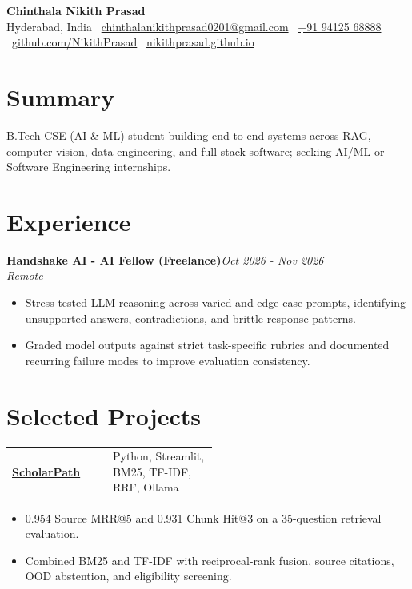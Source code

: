 \documentclass[10pt,letterpaper]{article}
\makeatletter
\newcommand{\projectheading}[3]{%
  \begin{tabularx}{\linewidth}{@{}>{\raggedright\arraybackslash}X>{\raggedleft\arraybackslash}p{0.51\linewidth}@{}}
    \href{#2}{\textbf{#1}} & {\footnotesize #3}\\
  \end{tabularx}%
}
\makeatother
\begin{document}
\fontsize{10.2}{12.8}\selectfont

\begin{center}
  {\fontsize{20}{22}\selectfont\bfseries Chinthala Nikith Prasad}\\[3pt]
  {\small Hyderabad, India \textbar\
  \href{mailto:chinthalanikithprasad0201@gmail.com}{chinthalanikithprasad0201@gmail.com} \textbar\
  \href{tel:+919412568888}{+91 94125 68888} \textbar\
  \href{https://github.com/NikithPrasad}{github.com/NikithPrasad} \textbar\
  \href{https://nikithprasad.github.io}{nikithprasad.github.io}}
\end{center}
\vspace{-7pt}

\section*{Summary}
B.Tech CSE (AI \& ML) student building end-to-end systems across RAG, computer vision, data engineering, and full-stack software; seeking AI/ML or Software Engineering internships.

\section*{Experience}
\textbf{Handshake AI - AI Fellow (Freelance)}\hfill\textit{Oct 2026 - Nov 2026}\\[-1pt]
\textit{Remote}
\begin{itemize}
  \item Stress-tested LLM reasoning across varied and edge-case prompts, identifying unsupported answers, contradictions, and brittle response patterns.
  \item Graded model outputs against strict task-specific rubrics and documented recurring failure modes to improve evaluation consistency.
\end{itemize}

\section*{Selected Projects}
\projectheading{ScholarPath}{https://github.com/NikithPrasad/ScholarPath}{Python, Streamlit, BM25, TF-IDF, RRF, Ollama}
\begin{itemize}
  \item 0.954 Source MRR@5 and 0.931 Chunk Hit@3 on a 35-question retrieval evaluation.
  \item Combined BM25 and TF-IDF with reciprocal-rank fusion, source citations, OOD abstention, and eligibility screening.
\end{itemize}
\vspace{3.5pt}
\end{document}
